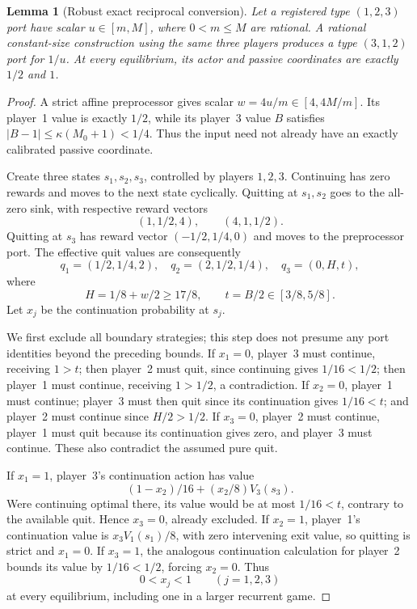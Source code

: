 \documentclass[11pt,a4paper]{article}
\numberwithin{equation}{section}
\newtheorem{lemma}[theorem]{Lemma}
\theoremstyle{definition}
\begin{document}
\begin{lemma}[Robust exact reciprocal conversion]\label{lem:recip}
Let a registered type \((1,2,3)\) port have scalar
\(u\in[m,M]\), where \(0<m\leq M\) are rational. A rational
constant-size construction using the same three players produces a
type \((3,1,2)\) port for \(1/u\). At every equilibrium, its actor
and passive coordinates are exactly \(1/2\) and \(1\).
\end{lemma}
\begin{proof}
A strict affine preprocessor gives scalar \(w=4u/m\in[4,4M/m]\).
Its player~1 value is exactly \(1/2\), while its player~3 value \(B\)
satisfies \(|B-1|\leq\kappa(M_0+1)<1/4\). Thus the input need not
already have an exactly calibrated passive coordinate.

Create three states \(s_1,s_2,s_3\), controlled by players \(1,2,3\).
Continuing has zero rewards and moves to the next state cyclically.
Quitting at \(s_1,s_2\) goes to the all-zero sink, with respective
reward vectors
\[
 (1,1/2,4),\qquad (4,1,1/2).
\]
Quitting at \(s_3\) has reward vector \((-1/2,1/4,0)\) and moves to
the preprocessor port. The effective quit values are consequently
\begin{equation}\label{eq:triadquit}
 q_1=(1/2,1/4,2),\quad q_2=(2,1/2,1/4),\quad
 q_3=(0,H,t),
\end{equation}
where
\begin{equation}\label{eq:Hrange}
 H=1/8+w/2\geq17/8,\qquad t=B/2\in[3/8,5/8].
\end{equation}
Let \(x_j\) be the continuation probability at \(s_j\).

We first exclude all boundary strategies; this step does not presume
any port identities beyond the preceding bounds. If \(x_1=0\),
player~3 must continue, receiving \(1>t\); then player~2 must quit,
since continuing gives \(1/16<1/2\); then player~1 must continue,
receiving \(1>1/2\), a contradiction. If \(x_2=0\), player~1 must
continue; player~3 must then quit since its continuation gives
\(1/16<t\); and player~2 must continue since \(H/2>1/2\).
If \(x_3=0\), player~2 must continue, player~1 must quit because its
continuation gives zero, and player~3 must continue. These also
contradict the assumed pure quit.

If \(x_1=1\), player~3's continuation action has value
\[
 (1-x_2)/16+(x_2/8)V_3(s_3).
\]
Were continuing optimal there, its value would be at most \(1/16<t\),
contrary to the available quit. Hence \(x_3=0\), already excluded.
If \(x_2=1\), player~1's continuation value is
\(x_3V_1(s_1)/8\), with zero intervening exit value, so quitting is
strict and \(x_1=0\). If \(x_3=1\), the analogous continuation
calculation for player~2 bounds its value by \(1/16<1/2\), forcing
\(x_2=0\). Thus
\begin{equation}\label{eq:triadinterior}
 0<x_j<1\qquad(j=1,2,3)
\end{equation}
at every equilibrium, including one in a larger recurrent game.


\end{proof}
\end{document}
